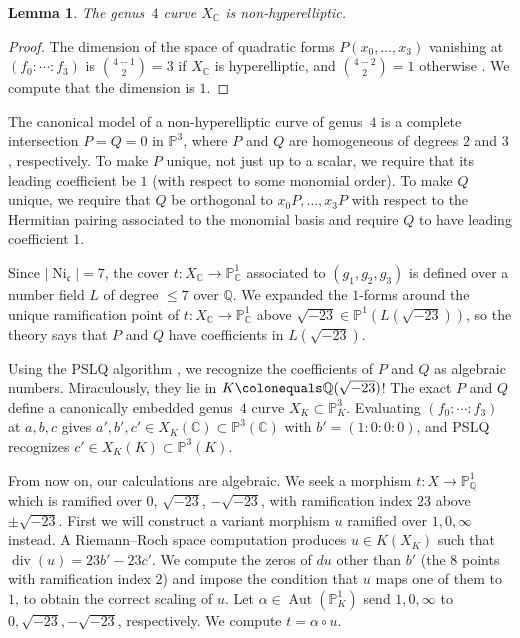\documentclass[12pt,reqno]{amsart}
\newcommand{\C}{\mathbb{C}}
\newcommand{\PP}{\mathbb{P}}
\newcommand{\Q}{\mathbb{Q}}
\newcommand{\cc}{\mathfrak{c}}
\DeclareMathOperator{\Aut}{Aut}
\DeclareMathOperator{\divv}{div}
\DeclareMathOperator{\Ni}{Ni}
\newtheorem{lemma}[theorem]{Lemma}
\theoremstyle{definition}
\theoremstyle{remark}
\begin{document}
\begin{lemma} 
The genus~$4$ curve $X_\C$ is non-hyperelliptic.
\end{lemma}

\begin{proof}
The dimension of the space of quadratic forms $P(x_0,\ldots,x_3)$ vanishing at $(f_0:\cdots:f_3)$ 
is $\binom{4-1}{2} = 3$ if $X_\C$ is hyperelliptic, and $\binom{4-2}{2} = 1$ otherwise \cite[Lemma~4.3]{Bommel-Costa-Poonen-Srinivasan2026}.
We compute that the dimension is $1$.
\end{proof}

The canonical model of a non-hyperelliptic curve of genus~$4$ is a complete intersection $P=Q=0$ in $\PP^3$, where $P$ and $Q$ are homogeneous of degrees $2$ and $3$, respectively.
To make $P$ unique, not just up to a scalar, we require that its leading coefficient be $1$ (with respect to some monomial order).
To make $Q$ unique, we require that $Q$ be orthogonal to $x_0 P,\ldots,x_3 P$ with respect to the Hermitian  pairing associated to the monomial basis and require $Q$ to have leading coefficient $1$.

Since $\lvert \Ni_\cc \rvert = 7$, the cover $t \colon X_\C \to \PP^1_\C$ associated to $(g_1,g_2,g_3)$ is defined over a number field $L$ of degree $\le 7$ over $\Q$.
We expanded the $1$-forms around the unique ramification point of $t \colon X_\C \to \PP^1_\C$ above $\sqrt{-23} \in \PP^1(L(\sqrt{-23}))$,
so the theory says that $P$ and $Q$ have coefficients in $L(\sqrt{-23})$.

Using the PSLQ algorithm \cite{PSLQ}, we recognize the coefficients of $P$ and $Q$ as algebraic numbers.
Miraculously, they lie in $K \colonequals \Q(\sqrt{-23})$! 
The exact $P$ and $Q$ define a canonically embedded genus~$4$ curve $X_K \subset \PP^3_K$.
Evaluating $(f_0:\cdots:f_3)$ at $a,b,c$ gives $a',b',c' \in X_K(\C) \subset \PP^3(\C)$
with $b' = (1:0:0:0)$, and PSLQ recognizes $c' \in X_K(K) \subset \PP^3(K)$. 

From now on, our calculations are algebraic.
We seek a morphism $t \colon X \to \PP^1_\Q$ which is ramified over $0$, $\sqrt{-23}$, $-\sqrt{-23}$, with ramification index $23$ above $\pm \sqrt{-23}$.
First we will construct a variant morphism $u$ ramified over $1,0,\infty$ instead.
A Riemann--Roch space computation produces $u \in K(X_K)$ such that $\divv(u) = 23b' - 23c'$.
We compute the zeros of $du$ other than $b'$ (the $8$ points with ramification index $2$)
and impose the condition that $u$ maps one of them to $1$, to obtain the correct scaling of $u$.
Let $\alpha \in \Aut(\PP^1_K)$ send $1,0,\infty$ to $0, \sqrt{-23}, -\sqrt{-23}$, respectively.
We compute $t = \alpha \circ u$.
\end{document}
